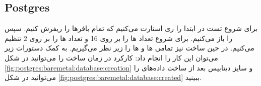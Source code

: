 \subsection{Postgres}
برای شروع تست در ابتدا
را ری استارت می‌کنیم که تمام بافر‌ها را ریفرش کنیم. سپس
را باز می‌کنیم. برای شروع تعداد
ها
را بر روی 16 و تعداد
ها
را بر روی 2 تنظیم می‌کنیم. در حین ساخت
نیز تمامی
ها و ها
را زیر نظر می‌گیریم. به کمک دستورات زیر می‌توان این کار را انجام داد:
کارکرد
در زمان ساخت را می‌توانید در شکل
\ref{fig:postgres:baremetal:database:creation}
و سایز دیتابیس بعد از ساخت داده‌های
را می‌توانید در شکل
\ref{fig:postgres:baremetal:database:created}
ببینید.

